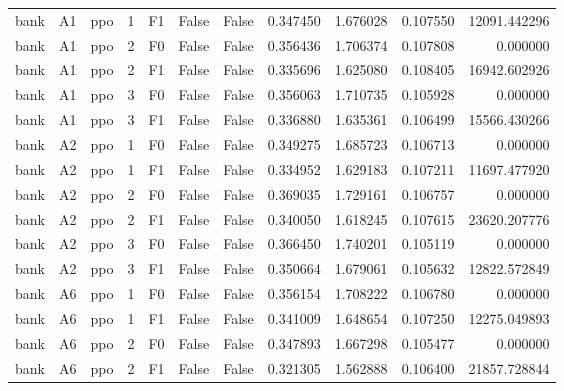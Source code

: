 \begin{tabular}{lllrlllrrrr}
      bank &      A1 &       ppo &     1 &  F1 &           False &            False &  0.347450 &  1.676028 & 0.107550 &     12091.442296 \\
      bank &      A1 &       ppo &     2 &  F0 &           False &            False &  0.356436 &  1.706374 & 0.107808 &         0.000000 \\
      bank &      A1 &       ppo &     2 &  F1 &           False &            False &  0.335696 &  1.625080 & 0.108405 &     16942.602926 \\
      bank &      A1 &       ppo &     3 &  F0 &           False &            False &  0.356063 &  1.710735 & 0.105928 &         0.000000 \\
      bank &      A1 &       ppo &     3 &  F1 &           False &            False &  0.336880 &  1.635361 & 0.106499 &     15566.430266 \\
      bank &      A2 &       ppo &     1 &  F0 &           False &            False &  0.349275 &  1.685723 & 0.106713 &         0.000000 \\
      bank &      A2 &       ppo &     1 &  F1 &           False &            False &  0.334952 &  1.629183 & 0.107211 &     11697.477920 \\
      bank &      A2 &       ppo &     2 &  F0 &           False &            False &  0.369035 &  1.729161 & 0.106757 &         0.000000 \\
      bank &      A2 &       ppo &     2 &  F1 &           False &            False &  0.340050 &  1.618245 & 0.107615 &     23620.207776 \\
      bank &      A2 &       ppo &     3 &  F0 &           False &            False &  0.366450 &  1.740201 & 0.105119 &         0.000000 \\
      bank &      A2 &       ppo &     3 &  F1 &           False &            False &  0.350664 &  1.679061 & 0.105632 &     12822.572849 \\
      bank &      A6 &       ppo &     1 &  F0 &           False &            False &  0.356154 &  1.708222 & 0.106780 &         0.000000 \\
      bank &      A6 &       ppo &     1 &  F1 &           False &            False &  0.341009 &  1.648654 & 0.107250 &     12275.049893 \\
      bank &      A6 &       ppo &     2 &  F0 &           False &            False &  0.347893 &  1.667298 & 0.105477 &         0.000000 \\
      bank &      A6 &       ppo &     2 &  F1 &           False &            False &  0.321305 &  1.562888 & 0.106400 &     21857.728844 \\

\end{tabular}
